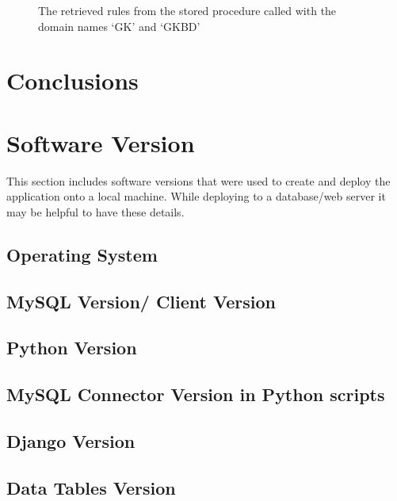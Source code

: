 \documentclass[msc,deptreport,ai]{infthesis}      %
\begin{document}
\begin{enumerate}
\begin{figure}[H]
		\caption{The retrieved rules from the stored procedure called with the domain names `GK' and `GKBD'}
		\label{fig:CorrectnessDomainName2}		
	\end{figure}	
\end{enumerate}

\chapter{Conclusions}









 \appendix
% 
\chapter{Software Version}
% 
This section includes software versions that were used to create and deploy the application onto a local machine. While deploying to a database/web server it may be helpful to have these details.
 \section{Operating System}
 \section{MySQL Version/ Client Version}
 \section{Python Version}
 \section{MySQL Connector Version in Python scripts}
 \section{Django Version}
 \section{Data Tables Version}
 
\end{document}

